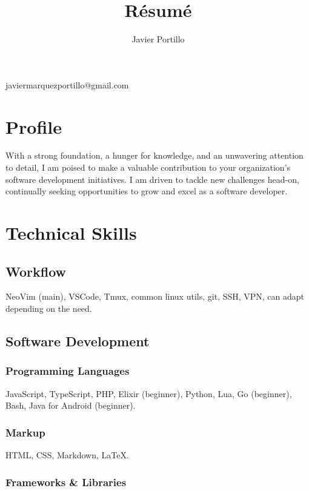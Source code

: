\documentclass[letterpaper]{article}
\makeatletter
\renewcommand{\maketitle}{
	\begin{center}
		{\huge\bfseries\theauthor}

		\vspace{.5em}

		javiermarquezportillo@gmail.com
	\end{center}
}
\makeatother
\begin{document}
\title{R\'esum\'e}
\author{Javier Portillo}

\maketitle

\section{Profile}

With a strong foundation, a hunger for knowledge, and an unwavering attention to detail, I am poised to make a valuable contribution to your organization's software development initiatives. I am driven to tackle new challenges head-on, continually seeking opportunities to grow and excel as a software developer.

\section{Technical Skills}

\subsection{Workflow}

NeoVim (main), VSCode, Tmux, common linux utils, git, SSH, VPN, can adapt depending on the need.

\subsection{Software Development}

\subsubsection{Programming Languages}

JavaScript, TypeScript, PHP, Elixir (beginner), Python, Lua, Go (beginner), Bash, Java for Android (beginner).

\subsubsection{Markup}

HTML, CSS, Markdown, \LaTeX{}.

\subsubsection{Frameworks \& Libraries}
\end{document}
